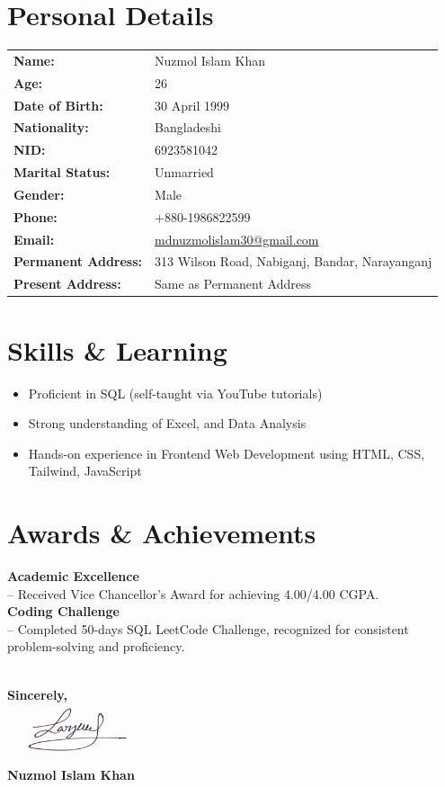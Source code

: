 \documentclass[a4paper,10pt]{article}
\newcommand{\cvsection}[2]{%
  \section*{\textcolor{blue!50!black}{#1}}\label{#2}%
  \vspace{4pt}%
}
\begin{document}
\cvsection{Personal Details}{sec:personal}

\begin{tabular}{p{6cm} p{10cm}}
\textbf{Name:} & Nuzmol Islam Khan \\
\textbf{Age:} & 26 \\
\textbf{Date of Birth:} & 30 April 1999 \\
\textbf{Nationality:} & Bangladeshi \\
\textbf{NID:} & 6923581042 \\
\textbf{Marital Status:} & Unmarried \\
\textbf{Gender:} & Male \\
\textbf{Phone:} & +880-1986822599 \\
\textbf{Email:} & \href{mailto:mdnuzmolislam30@gmail.com}{mdnuzmolislam30@gmail.com} \\
\textbf{Permanent Address:} & 313 Wilson Road, Nabiganj, Bandar, Narayanganj \\
\textbf{Present Address:} & Same as Permanent Address \\
\end{tabular}

\cvsection{Skills \& Learning}{sec:learning}
\begin{itemize}
  \item Proficient in SQL (self-taught via YouTube tutorials)
  \item Strong understanding of Excel, and Data Analysis
  \item Hands-on experience in Frontend Web Development using HTML, CSS, Tailwind, JavaScript
\end{itemize}

\cvsection{Awards \& Achievements}{sec:awards}

\textbf{Academic Excellence} \\
-- Received Vice Chancellor's Award for achieving 4.00/4.00 CGPA. \\[1mm]

\textbf{Coding Challenge} \\
-- Completed 50-days SQL LeetCode Challenge, recognized for consistent problem-solving and proficiency.

\vspace{14pt}

\vspace{10pt}
\\[3pt]
\textbf{Sincerely,} \\[6pt]
\includegraphics[width=4cm]{Signature.jpg} \\ %
\textbf{Nuzmol Islam Khan}
\end{document}
